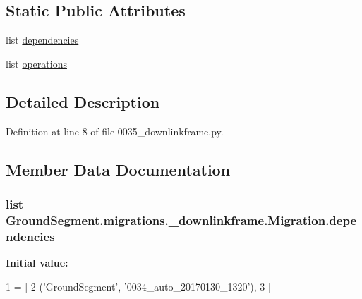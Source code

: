 \subsection*{Static Public Attributes}
\begin{DoxyCompactItemize}
\item 
list \hyperlink{class_ground_segment_1_1migrations_1_10035__downlinkframe_1_1_migration_ada3fdfe2fe65531d9462a0cd4c5066d5}{dependencies}
\item 
list \hyperlink{class_ground_segment_1_1migrations_1_10035__downlinkframe_1_1_migration_ace17035a4f8c8a057c08fa1dd2a182d7}{operations}
\end{DoxyCompactItemize}


\subsection{Detailed Description}


Definition at line 8 of file 0035\+\_\+downlinkframe.\+py.



\subsection{Member Data Documentation}
\hypertarget{class_ground_segment_1_1migrations_1_10035__downlinkframe_1_1_migration_ada3fdfe2fe65531d9462a0cd4c5066d5}{}
\subsubsection[{dependencies}]{\setlength{\rightskip}{0pt plus 5cm}list Ground\+Segment.\+migrations.\+\_\+downlinkframe.\+Migration.\+dependencies\hspace{0.3cm}{\ttfamily [static]}}\label{class_ground_segment_1_1migrations_1_10035__downlinkframe_1_1_migration_ada3fdfe2fe65531d9462a0cd4c5066d5}
{\bfseries Initial value\+:}
\begin{DoxyCode}
1 = [
2         (\textcolor{stringliteral}{'GroundSegment'}, \textcolor{stringliteral}{'0034\_auto\_20170130\_1320'}),
3     ]
\end{DoxyCode}



